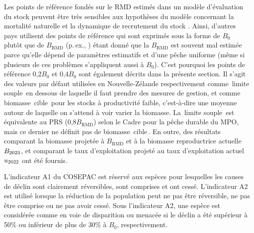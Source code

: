 \documentclass[11pt]{book}
\newcommand{\Bmsy}{B_\text{RMD}}
\newcommand{\pc}{\%}
\newcommand{\angL}{\guillemotleft\,}
\newcommand{\angR}{\,\guillemotright}
\begin{document}
Les points de r\'{e}f\'{e}rence fond\'{e}s sur le RMD estim\'{e}s dans un mod\`{e}le d'\'{e}valuation du stock peuvent \^{e}tre tr\`{e}s sensibles aux hypoth\`{e}ses du mod\`{e}le concernant la mortalit\'{e} naturelle et la dynamique de recrutement du stock \citep{Forrest-etal:2018}.
Ainsi, d'autres pays utilisent des points de r\'{e}f\'{e}rence qui sont exprim\'{e}s sous la forme de $B_0$ plut\^{o}t que de $\Bmsy$ (p.\,ex., \citealt{NZMF:2011}) \'{e}tant donn\'{e} que la $\Bmsy$ est souvent mal estim\'{e}e parce qu'elle d\'{e}pend de param\`{e}tres estimatifs et d'une p\^{e}che uniforme (m\^{e}me si plusieurs de ces probl\`{e}mes s'appliquent aussi \`{a} $B_0$).
C'est pourquoi les points de r\'{e}f\'{e}rence 0,2$B_0$ et 0,4$B_0$ sont \'{e}galement d\'{e}crits dans la pr\'{e}sente section.
Il s'agit des valeurs par d\'{e}faut utilis\'{e}es en Nouvelle-Z\'{e}lande respectivement comme \angL{}limite souple\angR{} en dessous de laquelle il faut prendre des mesures de gestion, et comme biomasse \angL{}cible\angR{} pour les stocks \`{a} productivit\'{e} faible, c'est-\`{a}-dire une moyenne autour de laquelle on s'attend \`{a} voir varier la biomasse.
La \angL{}limite souple\angR{} est \'{e}quivalente au PRS (0,8$\Bmsy$) selon le Cadre pour la p\^{e}che durable du MPO, mais ce dernier ne d\'{e}finit pas de biomasse \angL{}cible\angR{}.
En outre, des r\'{e}sultats comparant la biomasse projet\'{e}e \`{a} $\Bmsy$ et \`{a} la biomasse reproductrice actuelle $B_{2023}$, et comparant le taux d'exploitation projet\'{e} au taux d'exploitation actuel $u_{2022}$ ont \'{e}t\'{e} fournis.

L'indicateur A1 du COSEPAC est r\'{e}serv\'{e} aux esp\`{e}ces pour lesquelles les causes de d\'{e}clin sont clairement r\'{e}versibles, sont comprises et ont cess\'{e}.
L'indicateur A2 est utilis\'{e} lorsque la r\'{e}duction de la population peut ne pas \^{e}tre r\'{e}versible, ne pas \^{e}tre comprise ou ne pas avoir cess\'{e}.
Sous l'indicateur A2, une esp\`{e}ce est consid\'{e}r\'{e}e comme en voie de disparition ou menac\'{e}e si le d\'{e}clin a \'{e}t\'{e} sup\'{e}rieur \`{a} 50\pc{} ou inf\'{e}rieur de plus de 30\pc{} \`{a} $B_0$, respectivement.
\end{document}
